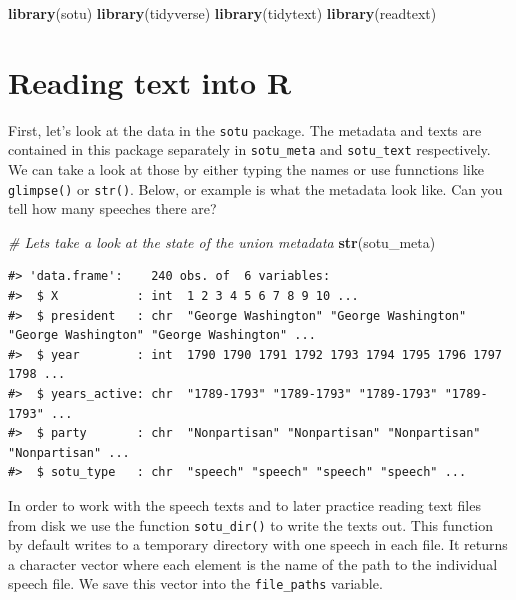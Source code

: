 \documentclass[
]{book}
\newenvironment{Shaded}{\begin{snugshade}}{\end{snugshade}}
\newcommand{\CommentTok}[1]{\textcolor[rgb]{0.56,0.35,0.01}{\textit{#1}}}
\newcommand{\FunctionTok}[1]{\textcolor[rgb]{0.13,0.29,0.53}{\textbf{#1}}}
\newcommand{\NormalTok}[1]{#1}
\begin{document}
\begin{Shaded}
\begin{Highlighting}[]
\FunctionTok{library}\NormalTok{(sotu)}
\FunctionTok{library}\NormalTok{(tidyverse)}
\FunctionTok{library}\NormalTok{(tidytext)}
\FunctionTok{library}\NormalTok{(readtext)}
\end{Highlighting}
\end{Shaded}

\section{Reading text into R}\label{reading-text-into-r}

First, let's look at the data in the \texttt{sotu} package. The metadata and texts are contained in this package separately in \texttt{sotu\_meta} and \texttt{sotu\_text} respectively. We can take a look at those by either typing the names or use funnctions like \texttt{glimpse()} or \texttt{str()}. Below, or example is what the metadata look like. Can you tell how many speeches there are?

\begin{Shaded}
\begin{Highlighting}[]
\CommentTok{\# Let\textquotesingle{}s take a look at the state of the union metadata}
\FunctionTok{str}\NormalTok{(sotu\_meta)}
\end{Highlighting}
\end{Shaded}

\begin{verbatim}
#> 'data.frame':    240 obs. of  6 variables:
#>  $ X           : int  1 2 3 4 5 6 7 8 9 10 ...
#>  $ president   : chr  "George Washington" "George Washington" "George Washington" "George Washington" ...
#>  $ year        : int  1790 1790 1791 1792 1793 1794 1795 1796 1797 1798 ...
#>  $ years_active: chr  "1789-1793" "1789-1793" "1789-1793" "1789-1793" ...
#>  $ party       : chr  "Nonpartisan" "Nonpartisan" "Nonpartisan" "Nonpartisan" ...
#>  $ sotu_type   : chr  "speech" "speech" "speech" "speech" ...
\end{verbatim}

In order to work with the speech texts and to later practice reading text files from disk we use the function \texttt{sotu\_dir()} to write the texts out. This function by default writes to a temporary directory with one speech in each file. It returns a character vector where each element is the name of the path to the individual speech file. We save this vector into the \texttt{file\_paths} variable.
\end{document}
